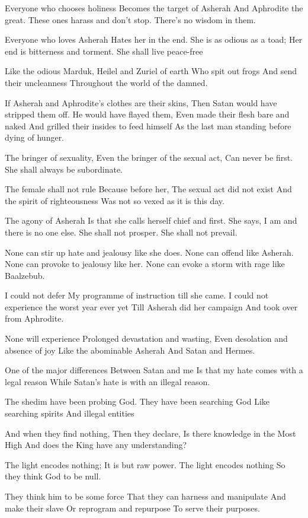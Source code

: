 \documentclass[
]{book}
\begin{document}
Everyone who chooses holiness
Becomes the target of Asherah
And Aphrodite the great.
These ones harass and don't stop.
There's no wisdom in them.

Everyone who loves Asherah
Hates her in the end.
She is as odious as a toad;
Her end is bitterness and torment.
She shall live peace-free

Like the odious
Marduk, Heilel and Zuriel of earth
Who spit out frogs
And send their uncleanness
Throughout the world of the damned.

If Asherah and Aphrodite's clothes are their skins,
Then Satan would have stripped them off.
He would have flayed them,
Even made their flesh bare and naked
And grilled their insides to feed himself
As the last man standing before dying of hunger.

The bringer of sexuality,
Even the bringer of the sexual act,
Can never be first.
She shall always be subordinate.

The female shall not rule
Because before her,
The sexual act did not exist
And the spirit of righteousness
Was not so vexed as it is this day.

The agony of Asherah
Is that she calls herself chief and first.
She says, I am and there is no one else.
She shall not prosper.
She shall not prevail.

None can stir up hate and jealousy like she does.
None can offend like Asherah.
None can provoke to jealousy like her.
None can evoke a storm with rage like Baalzebub.

I could not defer
My programme of instruction till she came.
I could not experience the worst year ever yet
Till Asherah did her campaign
And took over from Aphrodite.

None will experience
Prolonged devastation and wasting,
Even desolation and absence of joy
Like the abominable Asherah
And Satan and Hermes.

One of the major differences
Between Satan and me
Is that my hate comes with a legal reason
While Satan's hate is with an illegal reason.

The shedim have been probing God.
They have been searching God
Like searching spirits
And illegal entities

And when they find nothing,
Then they declare,
Is there knowledge in the Most High
And does the King have any understanding?

The light encodes nothing;
It is but raw power.
The light encodes nothing
So they think God to be null.

They think him to be some force
That they can harness and manipulate
And make their slave
Or reprogram and repurpose
To serve their purposes.
\end{document}
